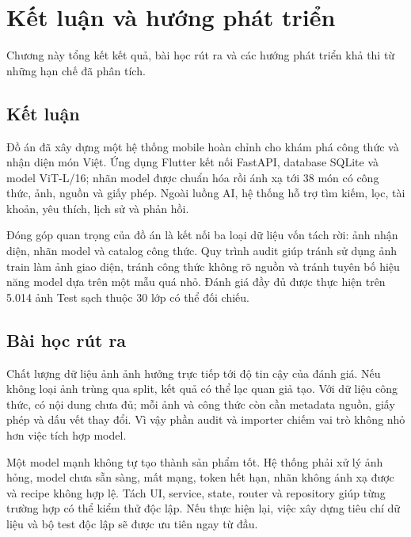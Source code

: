 \chapter{Kết luận và hướng phát triển}
\label{ch:ketluan}

\begin{muctieu}
Chương này tổng kết kết quả, bài học rút ra và các hướng phát triển khả thi
từ những hạn chế đã phân tích.
\end{muctieu}

\section{Kết luận}

Đồ án đã xây dựng một hệ thống mobile hoàn chỉnh cho khám phá công thức và
nhận diện món Việt. Ứng dụng Flutter kết nối FastAPI, database SQLite và model
ViT-L/16; nhãn model được chuẩn hóa rồi ánh xạ tới 38 món có công thức, ảnh,
nguồn và giấy phép. Ngoài luồng AI, hệ thống hỗ trợ tìm kiếm, lọc, tài khoản,
yêu thích, lịch sử và phản hồi.

Đóng góp quan trọng của đồ án là kết nối ba loại dữ liệu vốn tách rời: ảnh
nhận diện, nhãn model và catalog công thức. Quy trình audit giúp tránh sử
dụng ảnh train làm ảnh giao diện, tránh công thức không rõ nguồn và tránh
tuyên bố hiệu năng model dựa trên một mẫu quá nhỏ. Đánh giá đầy đủ được thực
hiện trên 5.014 ảnh Test sạch thuộc 30 lớp có thể đối chiếu.

\section{Bài học rút ra}

Chất lượng dữ liệu ảnh ảnh hưởng trực tiếp tới độ tin cậy của đánh giá. Nếu
không loại ảnh trùng qua split, kết quả có thể lạc quan giả tạo. Với dữ liệu
công thức, có nội dung chưa đủ; mỗi ảnh và công thức còn cần metadata nguồn,
giấy phép và dấu vết thay đổi. Vì vậy phần audit và importer chiếm vai trò
không nhỏ hơn việc tích hợp model.

\begin{samepage}
Một model mạnh không tự tạo thành sản phẩm tốt. Hệ thống phải xử lý ảnh hỏng,
model chưa sẵn sàng, mất mạng, token hết hạn, nhãn không ánh xạ được và recipe
không hợp lệ. Tách UI, service, state, router và repository giúp từng trường
hợp có thể kiểm thử độc lập. Nếu thực hiện lại, việc xây dựng tiêu chí dữ liệu
và bộ test độc lập sẽ được ưu tiên ngay từ đầu.
\end{samepage}

